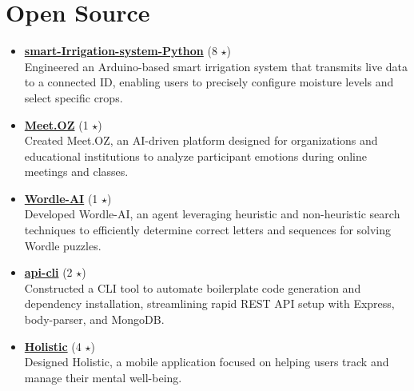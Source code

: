 \documentclass[10pt,a4paper]{article}
\begin{document}
\section{Open Source}
\begin{itemize}[itemsep=3pt]
  \item \textbf{\href{https://github.com/prkhrv/smart-Irrigation-system-Python}{smart-Irrigation-system-Python}} {\small (8 \(\star\))} \\ Engineered an Arduino-based smart irrigation system that transmits live data to a connected ID, enabling users to precisely configure moisture levels and select specific crops.
  \item \textbf{\href{https://github.com/prkhrv/Meet.OZ}{Meet.OZ}} {\small (1 \(\star\))} \\ Created Meet.OZ, an AI-driven platform designed for organizations and educational institutions to analyze participant emotions during online meetings and classes.
  \item \textbf{\href{https://github.com/prkhrv/Wordle-AI}{Wordle-AI}} {\small (1 \(\star\))} \\ Developed Wordle-AI, an agent leveraging heuristic and non-heuristic search techniques to efficiently determine correct letters and sequences for solving Wordle puzzles.
  \item \textbf{\href{https://github.com/prkhrv/api-cli}{api-cli}} {\small (2 \(\star\))} \\ Constructed a CLI tool to automate boilerplate code generation and dependency installation, streamlining rapid REST API setup with Express, body-parser, and MongoDB.
  \item \textbf{\href{https://github.com/prkhrv/Holistic}{Holistic}} {\small (4 \(\star\))} \\ Designed Holistic, a mobile application focused on helping users track and manage their mental well-being.
\end{itemize}
\end{document}
